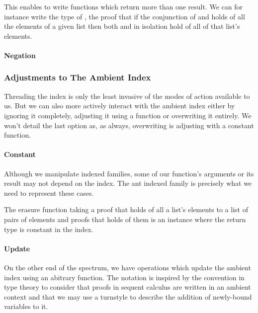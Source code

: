 
This enables to write functions which return more than one result. We can
for instance write the type of , the proof that if the conjunction
of  and  holds of all the elements of a given list then both
 and  in isolation hold of all of that list's elements.

\paragraph{Negation}


\subsubsection{Adjustments to The Ambient Index}

Threading the index is only the least invasive of the modes of action
available to us. But we can also more actively interact with the ambient
index either by ignoring it completely, adjusting it using a function
or overwriting it entirely. We won't detail the last option as, as always,
overwriting is adjusting with a constant function.

\paragraph{Constant} Although we manipulate indexed families, some of
our function's arguments or its result may not depend on the index.
The ant indexed family is precisely what we need to represent
these cases.


The erasure function taking a proof that  holds of all a list's
elements to a list of pairs of elements and proofs that  holds
of them is an instance where the return type is constant in the index.


\paragraph{Update} On the other end of the spectrum, we have operations
which update the ambient index using an abitrary function. The notation
 is inspired by the convention in type theory to consider that
proofs in sequent calculus are written in an ambient context and that we
may use a turnstyle to describe the addition of newly-bound variables to
it.

